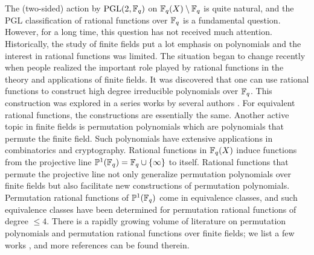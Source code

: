 \documentclass{amsart}
\numberwithin{equation}{section}
\theoremstyle{definition}
\newcommand{\f}{\Bbb F}
\newcommand{\pgl}{\mathrm{PGL}}
\begin{document}
The (two-sided) action by $\pgl(2,\f_q)$ on $\f_q(X)\setminus\f_q$ is quite natural, and the PGL classification of rational functions over $\f_q$ is a fundamental question. However, for a long time, this question has not received much attention. Historically, the study of finite fields put a lot emphasis on polynomials and the interest in rational functions was limited. The situation began to change recently when people realized the important role played by rational functions in the theory and applications of finite fields. It was discovered that one can use rational functions to construct high degree irreducible polynomials over $\f_q$. This construction was explored in a series works by several authors \cite{Ahmadi-FFA-2011, Mattarei-Pizzato-FFA-2017, Mattarei-Pizzato-FFA-2022, Panario-Reis-Wang-JPAA-2020, Reis-JPAA-2020, Reis-FFA-2020, Stichtenoth-Topuzoglu-FFA-2012}. For equivalent rational functions, the constructions are essentially the same. Another active topic in finite fields is permutation polynomials which are polynomials that permute the finite field. Such polynomials have extensive applications in combinatorics and cryptography. Rational functions in $\f_q(X)$ induce functions from the projective line $\Bbb P^1(\f_q)=\f_q\cup\{\infty\}$ to itself. Rational functions that permute the projective line not only generalize permutation polynomials over finite fields but also facilitate new constructions of permutation polynomials. Permutation rational functions of $\Bbb P^1(\f_q)$ come in equivalence classes, and such equivalence classes have been determined for permutation rational functions of degree $\le 4$.
There is a rapidly growing volume of literature on permutation polynomials and permutation rational functions over finite fields; we list a few works \cite{Ding-Zieve-AA-2022, Ferraguti-Micheli-DCC-2020, Hou-FFA-2015a, Hou-CA-2021, Sze-Thesis-2023, Wang-2019}, and more references can be found therein. 
\end{document}

